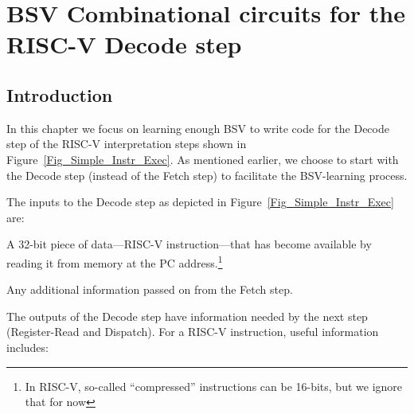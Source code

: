 

\chapter{BSV Combinational circuits for the RISC-V Decode step}


\setcounter{page}{1}
\renewcommand{\thepage}{\arabic{chapter}-\arabic{page}}

\label{ch_Combo_Circuits}


\section{Introduction}

In this chapter we focus on learning enough BSV to write code for the
Decode step of the RISC-V interpretation steps shown in
Figure~\ref{Fig_Simple_Instr_Exec}.  As mentioned earlier, we choose
to start with the Decode step (instead of the Fetch step) to
facilitate the BSV-learning process.

The inputs to the Decode step as depicted in
Figure~\ref{Fig_Simple_Instr_Exec} are:

\begin{tightlist}

 \item A 32-bit piece of data---RISC-V instruction---that has become
 available by reading it from memory at the PC address.\footnote{In
 RISC-V, so-called ``compressed'' instructions can be 16-bits, but we
 ignore that for now}

 \item Any additional information passed on from the Fetch step.

\end{tightlist}

The outputs of the Decode step have information needed by the next
step (Register-Read and Dispatch).  For a RISC-V instruction, useful
information includes:

